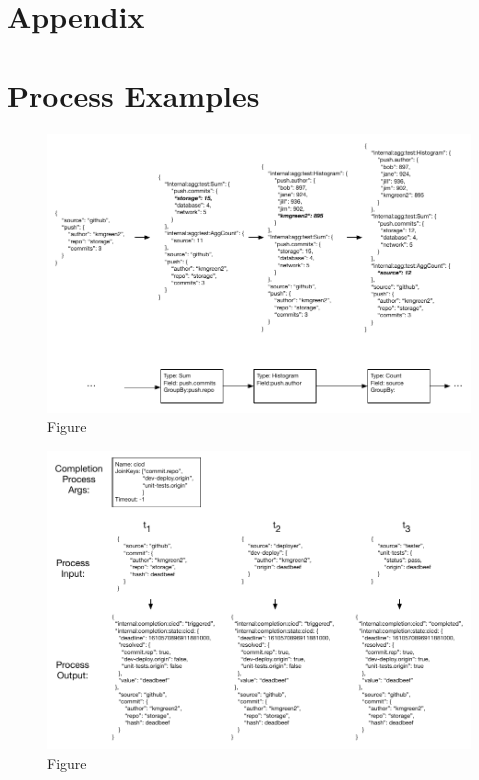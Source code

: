 \documentclass[10pt,twocolumn]{article}
\begin{document}



\section{Appendix}\label{sec:appendix}
\section{Process Examples}\label{sec:appendix:process}

\begin{figure}
\centering
\includegraphics{figures/aggregation.pdf}
\caption{Figure}
\label{fig:aggregation}
\end{figure}


\begin{figure}
\centering
\includegraphics{figures/completion.pdf}
\caption{Figure}
\label{fig:completion}
\end{figure}
\end{document}
